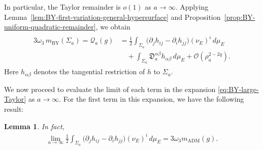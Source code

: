 \documentclass[10pt]{amsart}
\newcommand{\ADM}{\mathrm{ADM}}
\newcommand{\BY}{\mathrm{BY}}
\theoremstyle{plain}
\newtheorem{lemma}[theorem]{Lemma}
\theoremstyle{remark}
\begin{document}
	In particular, the Taylor remainder is $o(1)$ as $a\to\infty$. Applying Lemma~\ref{lem:BY-first-variation-general-hypersurface} and Proposition~\ref{prop:BY-uniform-quadratic-remainder}, we obtain
	\begin{align}\label{eq:BY-large-Taylor}
		\begin{split}
			3\omega_3\,m_{\BY}(\Sigma_a)
			=
			\mathcal Q_a(g)
			&=
			\frac12
			\int_{\Sigma_a}
			\bigl(
			\partial_jh_{ij}
			-
			\partial_ih_{jj}
			\bigr)(\nu_E)^i\,d\mu_E
			\\
			&\quad
			+
			\int_{\Sigma_a}
			\mathfrak D_a^{\alpha\beta}
			h_{\alpha\beta}\,d\mu_E
			+
			\mathcal O(\rho_a^{2-2q}).
		\end{split}
	\end{align}
	Here $h_{\alpha\beta}$ denotes the tangential restriction of $h$ to
	$\Sigma_a$.
	
	We now proceed to evaluate the limit of each term in the expansion \eqref{eq:BY-large-Taylor} as $a \to \infty$. For the first term in this expansion, we have the following result:
	
	\begin{lemma}\label{lem:AF-flux-limit}
		In fact,
		\begin{align}\label{eq:AF-flux-limit}
			\lim_{a\to\infty}
			\frac12
			\int_{\Sigma_a}
			\bigl(
			\partial_jh_{ij}
			-
			\partial_ih_{jj}
			\bigr)
			(\nu_E)^i\,d\mu_E
			=
			3\omega_3m_{\ADM}(g).
		\end{align}
	\end{lemma}
	
\end{document}

